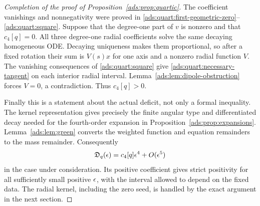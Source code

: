 \begin{proof}[Completion of the proof of Proposition~\ref{ads:prop:quartic}]
The coefficient vanishings and nonnegativity were proved in
\eqref{ads:quart:first-geometric-zero}--\eqref{ads:quart:square}.  Suppose
that the degree-one part of \(v\) is nonzero and that \(c_4[q]=0\).
All three degree-one radial coefficients solve the same decaying
homogeneous ODE.  Decaying uniqueness makes them proportional, so
after a fixed rotation their sum is \(V(s)x\) for one axis and a
nonzero radial function \(V\).  The vanishing consequences of
\eqref{ads:quart:square} give \eqref{ads:quart:necessary-tangent} on each
interior radial interval.  Lemma~\ref{ads:lem:dipole-obstruction} forces
\(V=0\), a contradiction.  Thus \(c_4[q]>0\).

Finally this is a statement about the actual deficit, not only a
formal inequality.  The kernel representation gives precisely the
finite angular type and differentiated decay needed for the
fourth-order expansion in Proposition~\ref{ads:prop:expansions}.
Lemma~\ref{ads:lem:green} converts the weighted function and equation
remainders to the mass remainder.  Consequently
\[
 \mathfrak D_q(\epsilon)=c_4[q]\epsilon^4+O(\epsilon^5)
\]
in the case under consideration.  Its positive coefficient gives
strict positivity for all sufficiently small positive \(\epsilon\),
with the interval allowed to depend on the fixed data.  The radial
kernel, including the zero seed, is handled by the exact argument in
the next section.
\end{proof}
